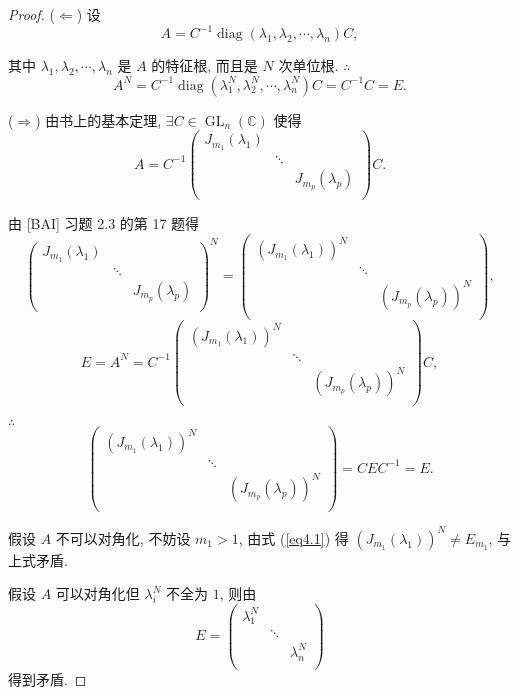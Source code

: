 \documentclass{ctexart}
\begin{document}
\begin{proof}
    ($\Leftarrow$) 设
    \[A=C^{-1}\operatorname{diag}(\lambda_1,\lambda_2,\cdots,\lambda_n)C,\]

    其中 $\lambda_1,\lambda_2,\cdots,\lambda_n$ 是 $A$ 的特征根, 而且是 $N$ 次单位根. $\therefore$
    \[A^N=C^{-1}\operatorname{diag}(\lambda_1^N,\lambda_2^N,\cdots,\lambda_n^N)C=C^{-1}C=E.\]

    ($\Rightarrow$) 由书上的基本定理, $\exists C\in\operatorname{GL}_n(\mathbb{C})$ 使得
    \[A=C^{-1}\begin{pmatrix}
        J_{m_1}(\lambda_1) \\
        & \ddots \\
        && J_{m_p}(\lambda_p) \\
    \end{pmatrix}C.\]

    由 [BAI] 习题 2.3 的第 17 题得
    \[\begin{pmatrix}
        J_{m_1}(\lambda_1) \\
        & \ddots \\
        && J_{m_p}(\lambda_p) \\
    \end{pmatrix}^N=\begin{pmatrix}
        (J_{m_1}(\lambda_1))^N \\
        & \ddots \\
        && (J_{m_p}(\lambda_p))^N \\
    \end{pmatrix},\]
    \[E=A^N=C^{-1}\begin{pmatrix}
        (J_{m_1}(\lambda_1))^N \\
        & \ddots \\
        && (J_{m_p}(\lambda_p))^N \\
    \end{pmatrix}C,\]

    $\therefore$
    \[\begin{pmatrix}
        (J_{m_1}(\lambda_1))^N \\
        & \ddots \\
        && (J_{m_p}(\lambda_p))^N \\
    \end{pmatrix}=CEC^{-1}=E.\]

    假设 $A$ 不可以对角化, 不妨设 $m_1>1$, 由式 (\ref{eq4.1}) 得 $(J_{m_1}(\lambda_1))^N\neq E_{m_1}$, 与上式矛盾.

    假设 $A$ 可以对角化但 $\lambda_i^N$ 不全为 $1$, 则由
    \[E=\begin{pmatrix}
        \lambda_1^N \\
        & \ddots \\
        && \lambda_n^N \\
    \end{pmatrix}\]
    得到矛盾.
\end{proof}
\end{document}
